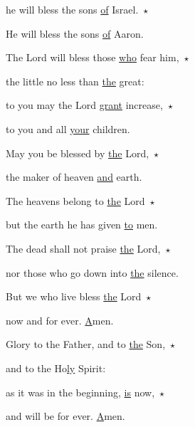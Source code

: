he will bless the sons \uline{of} Israel.~$\star$~\nopagebreak

He will bless the sons \uline{of} Aaron.



\noindent The Lord will bless those \uline{who} fear him,~$\star$~\nopagebreak

the little no less than \uline{the} great:

\noindent to you may the Lord \uline{grant} increase,~$\star$~\nopagebreak

to you and all \uline{your} children.



\noindent May you be blessed by \uline{the} Lord,~$\star$~\nopagebreak

the maker of heaven \uline{and} earth.

\noindent The heavens belong to \uline{the} Lord~$\star$~\nopagebreak

but the earth he has given \uline{to} men.



\noindent The dead shall not praise \uline{the} Lord,~$\star$~\nopagebreak

nor those who go down into \uline{the} silence.

\noindent But we who live bless \uline{the} Lord~$\star$~\nopagebreak

now and for ever. \uline{A}men.


\noindent Glory to the Father, and to \uline{the} Son,~$\star$~\nopagebreak

and to the Ho\uline{ly} Spirit:

\noindent as it was in the beginning, \uline{is} now,~$\star$~\nopagebreak

and will be for ever. \uline{A}men.
